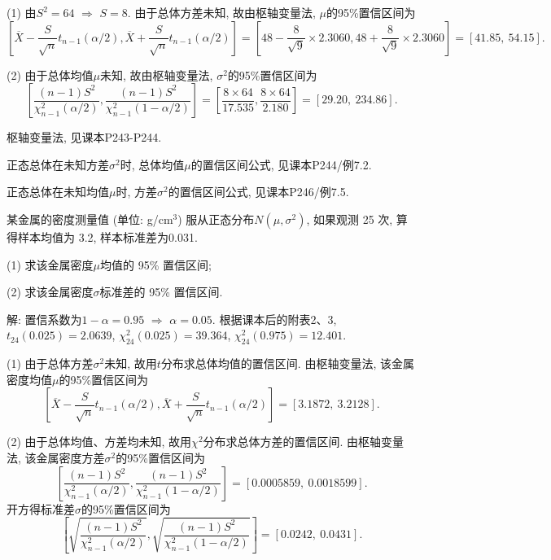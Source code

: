 \documentclass[standard]{ExBook}
\renewenvironment{shaded}{%
  \def\FrameCommand{\fboxsep=\FrameSep \colorbox{shadecolor}}%
  \MakeFramed{\advance\hsize-\width \FrameRestore}%
}{%
  \endMakeFramed
}
\begin{document}
\begin{qitems}
(1) 由$S^2=64$ $\Longrightarrow$ $S=8$. 由于总体方差未知, 故由枢轴变量法, $\mu$的95\%置信区间为
$$
\left[
\overline{X}-\frac{S}{\sqrt{n}}t_{n-1}(\alpha/2),
\overline{X}+\frac{S}{\sqrt{n}}t_{n-1}(\alpha/2)
\right]
=
\left[
48-\frac{8}{\sqrt{9}}\times2.3060,
48+\frac{8}{\sqrt{9}}\times2.3060
\right]
=
[41.85,\ 54.15].
$$

(2) 由于总体均值$\mu$未知, 故由枢轴变量法, $\sigma^2$的95\%置信区间为
$$
\left[
\frac{(n-1)S^2}{\chi_{n-1}^2(\alpha/2)},
\frac{(n-1)S^2}{\chi_{n-1}^2(1-\alpha/2)}
\right]
=
\left[
\frac{8\times64}{17.535},
\frac{8\times64}{2.180}
\right]
=
[29.20,\ 234.86].
$$

\textcolor{themeColor}{\selectfont {} 枢轴变量法, 见课本P243-P244.}

\textcolor{themeColor}{\selectfont {}
正态总体在未知方差$\sigma^2$时, 总体均值$\mu$的置信区间公式, 见课本P244/例7.2.}

\textcolor{themeColor}{\selectfont {}
正态总体在未知均值$\mu$时, 方差$\sigma^2$的置信区间公式, 见课本P246/例7.5.}

\vspace{2.5cm-5em}

    \begin{bbox}
    \begin{shaded}
        \qitem
某金属的密度测量值 (单位: g/cm$^3$) 服从正态分布$N(\mu,\sigma^2)$, 如果观测 25 次, 算得样本均值为 3.2, 样本标准差为0.031.

(1) 求该金属密度$\mu$均值的 95\% 置信区间;

(2) 求该金属密度$\sigma$标准差的 95\% 置信区间.
    \end{shaded}
    \end{bbox}

\vspace{\dimexpr2.5cm-5em\relax}

解: 置信系数为$1-\alpha=0.95$ $\Longrightarrow$ $\alpha=0.05$. 根据课本后的附表2、3, $t_{24}(0.025)=2.0639$, $\chi_{24}^2(0.025)=39.364$, $\chi_{24}^2(0.975)=12.401$.

(1) 由于总体方差$\sigma^2$未知, 故用$t$分布求总体均值的置信区间. 由枢轴变量法, 该金属密度均值$\mu$的95\%置信区间为
$$
\left[
\overline{X}-\frac{S}{\sqrt{n}}t_{n-1}(\alpha/2),
\overline{X}+\frac{S}{\sqrt{n}}t_{n-1}(\alpha/2)
\right]
=
[3.1872,\ 3.2128].
$$

(2) 由于总体均值、方差均未知, 故用$\chi^2$分布求总体方差的置信区间. 由枢轴变量法, 该金属密度方差$\sigma^2$的95\%置信区间为
$$
\left[
\frac{(n-1)S^2}{\chi_{n-1}^2(\alpha/2)},
\frac{(n-1)S^2}{\chi_{n-1}^2(1-\alpha/2)}
\right]
=
[0.0005859,\ 0.0018599].
$$
开方得标准差$\sigma$的95\%置信区间为
$$
\left[
\sqrt{\frac{(n-1)S^2}{\chi_{n-1}^2(\alpha/2)}},
\sqrt{\frac{(n-1)S^2}{\chi_{n-1}^2(1-\alpha/2)}}
\right]
=
[0.0242,\ 0.0431].
$$


\end{qitems}
\end{document}
